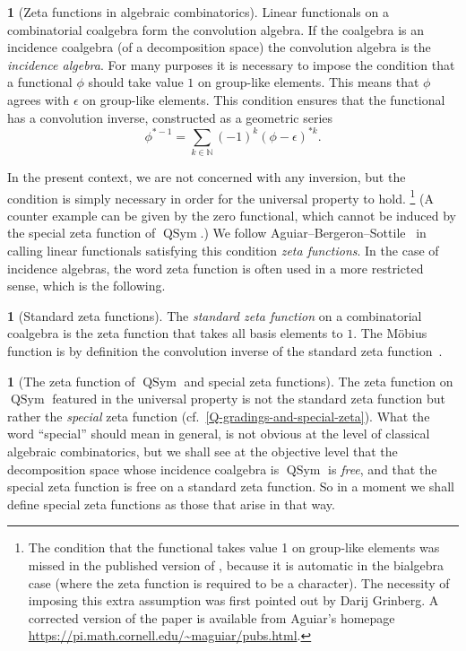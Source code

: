 \documentclass{amsart}
\newcommand{\QSym}{\operatorname{QSym}}
\newcommand{\N}{\mathbb{N}}
\theoremstyle{definition}
\theoremstyle{noname}
\newtheorem{blanko}[theorem]{}
\begin{document}
\begin{blanko}[Zeta functions in algebraic combinatorics]
  Linear functionals on a combinatorial coalgebra form the convolution
  algebra. If the coalgebra is an incidence coalgebra (of a decomposition space)
  the convolution algebra is the {\em incidence algebra}. For many purposes it is
  necessary to impose the condition that a functional $\phi$ should take value $1$ on
  group-like elements. This means that $\phi$ agrees with $\epsilon$ on group-like
  elements.
  This condition ensures that the functional has a convolution
  inverse, constructed as a geometric series
  \begin{equation}\label{conv-inv}
  \phi^{*-1} = \sum_{k\in\N} (-1)^k (\phi-\epsilon)^{*k} .
  \end{equation}

  In the present context, we are not concerned 
  with any inversion, but the condition is simply necessary
  in order for the universal property to hold.%
        \footnote{The condition that the functional takes value 1 on group-like elements was missed in the published version of \cite{Aguiar-Bergeron-Sottile}, 
        because it is automatic in the
        bialgebra case (where the zeta function is required to be a character).
        The necessity of imposing this extra assumption was first pointed out by
        Darij Grinberg. A corrected version of the paper is available from
        Aguiar's homepage \url{https://pi.math.cornell.edu/~maguiar/pubs.html}.}
  (A counter example can be given by the zero functional, which cannot be
  induced by the special zeta function of $\QSym$.)
  We follow Aguiar--Bergeron--Sottile~\cite{Aguiar-Bergeron-Sottile} in calling
  linear functionals satisfying this condition {\em zeta functions}. In the case
  of incidence algebras, the word zeta function is often used in a more
  restricted sense, which is the following.
\end{blanko}


\begin{blanko}[Standard zeta functions]
  The {\em standard zeta function} on a combinatorial coalgebra is the zeta
  function that takes all basis elements to $1$. The Möbius function is by
  definition the convolution inverse of the standard zeta
  function~\cite{Rota:Moebius}.
\end{blanko}

\begin{blanko}[The zeta function of $\QSym$ and special zeta functions]
  The zeta function on $\QSym$ featured in the universal property is not the 
  standard zeta function but rather the
  {\em special} zeta function (cf.\ \ref{Q-gradings-and-special-zeta}). 
  What the word ``special'' should mean in
  general, is not obvious at the level of classical algebraic
  combinatorics, but we shall see at the objective level that the decomposition
  space whose incidence coalgebra is $\QSym$ is {\em free}, and that the special zeta
  function is free on a standard zeta function. So in a moment we shall define
  special zeta functions as those that arise in that way.
\end{blanko}
\end{document}
